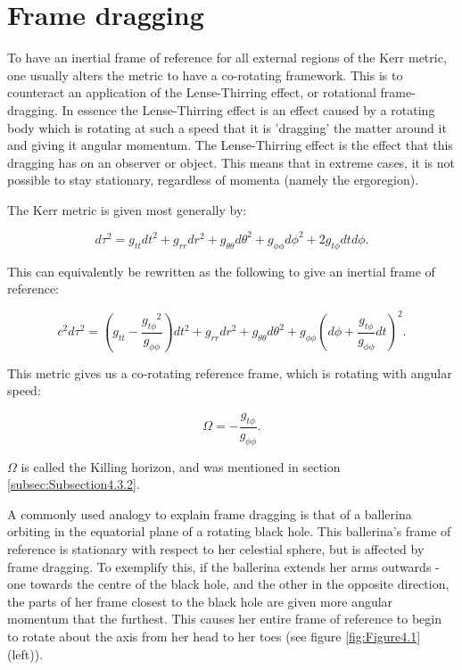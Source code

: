 \documentclass[oneside,openright,frontopenright, singlespacing]{dmathesis}
\begin{document}
\section{Frame dragging}\label{sec:Section4.4}

	To have an inertial frame of reference for all external regions of the Kerr metric, one usually alters the metric to have a co-rotating framework. This is to counteract an application of the Lense-Thirring effect, or rotational frame-dragging. In essence the Lense-Thirring effect is an effect caused by a rotating body which is rotating at such a speed that it is 'dragging' the matter around it and giving it angular momentum. The Lense-Thirring effect is the effect that this dragging has on an observer or object. This means that in extreme cases, it is not possible to stay stationary, regardless of momenta (namely the ergoregion).

\vspace{1em}
	The Kerr metric is given most generally by:

	\[d\tau^2 = g_{tt}dt^2+g_{rr}dr^2+g_{\theta\theta}d\theta^2+g_{\phi\phi}d\phi^2+2g_{t\phi}dtd\phi.\]

\vspace{1em}
	This can equivalently be rewritten as the following to give an inertial frame of reference:

	\[c^2d\tau^2 = \left(g_{tt}-\frac{{g_{t\phi}}^2}{g_{\phi\phi}}\right)dt^2+g_{rr}dr^2+g_{\theta\theta}d\theta^2+g_{\phi\phi}\left(d\phi+\frac{g_{t\phi}}{g_{\phi\phi}}dt\right)^2.\]

\vspace{1em}
	This metric gives us a co-rotating reference frame, which is rotating with angular speed:

	\[\Omega = -\frac{g_{t\phi}}{g_{\phi\phi}}.\]

\vspace{1em}
	$\Omega$ is called the Killing horizon, and was mentioned in section \ref{subsec:Subsection4.3.2}.

\vspace{1em}
	A commonly used analogy to explain frame dragging is that of a ballerina orbiting in the equatorial plane of a rotating black hole. This ballerina's frame of reference is stationary with respect to her celestial sphere, but is affected by frame dragging. To exemplify this, if the ballerina extends her arms outwards - one towards the centre of the black hole, and the other in the opposite direction, the parts of her frame closest to the black hole are given more angular momentum that the furthest. This causes her entire frame of reference to begin to rotate about the axis from her head to her toes (see figure \ref{fig:Figure4.1} (left)).
\end{document}
